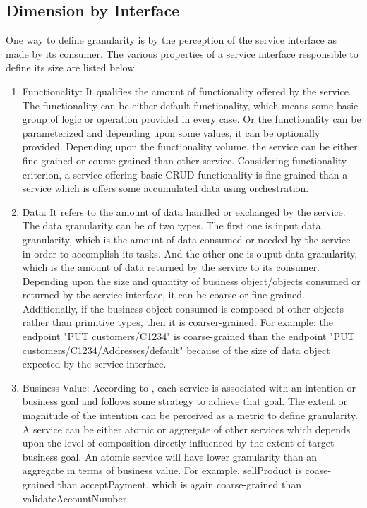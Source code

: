 \subsection{Dimension by Interface}\label{subsection:granularity/dimensions/interface}
One way to define granularity is by the perception of the service interface as made by its consumer. The various properties of a service interface responsible to define its size are listed below.
\begin{enumerate}
\item Functionality: It qualifies the amount of functionality offered by the service. The functionality can be either default functionality, which means some basic group of logic or operation provided in every case. Or the functionality can be parameterized and depending upon some values, it can be optionally provided. Depending upon the functionality volume, the service can be either fine-grained or course-grained than other service. Considering functionality criterion, a service offering basic CRUD functionality is fine-grained than a service which is offers some accumulated data using orchestration. \cite{Raf-Haesen:2015aa}
\\
\item Data: It refers to the amount of data handled or exchanged by the service. The data granularity can be of two types. The first one is input data granularity, which is the amount of data consumed or needed by the service in order to accomplish its tasks. And the other one is ouput data granularity, which is the amount of data returned by the service to its consumer. Depending upon the size and quantity of business object/objects consumed or returned by the service interface, it can be coarse or fine grained. Additionally, if the business object consumed is composed of other objects rather than primitive types, then it is coarser-grained. For example: the endpoint "PUT customers/C1234" is coarse-grained than the endpoint "PUT customers/C1234/Addresses/default" because of the size of data object expected by the service interface. \cite{Raf-Haesen:2015aa}
\\
\item Business Value: According to \cite{Rolland:2015aa}, each service is associated with an intention or business goal and follows some strategy to achieve that goal. The extent or magnitude of the intention can be perceived as a metric to define granularity. A service can be either atomic or aggregate of other services which depends upon the level of composition directly influenced by the extent of target business goal. An atomic service will have lower granularity than an aggregate in terms of business value. For example, sellProduct is coase-grained than acceptPayment, which is again coarse-grained than validateAccountNumber. \cite{Raf-Haesen:2015aa}
\end{enumerate}

